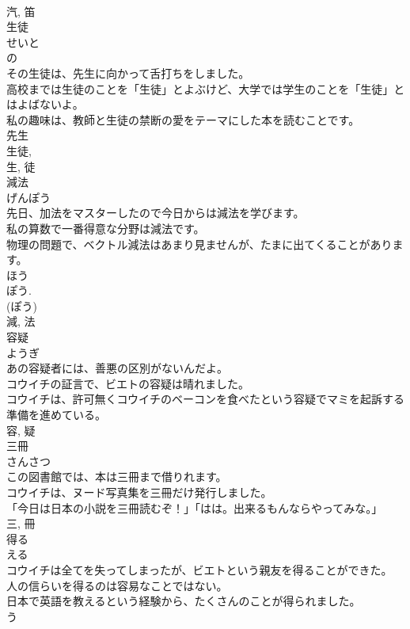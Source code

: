 \documentclass[8pt]{extreport}
\begin{document}
\begin{CJK}{UTF8}{min}
\\	汽, 笛	
\\	生徒	
\\	せいと	
\\	の 
\\	その生徒は、先生に向かって舌打ちをしました。	
\\	高校までは生徒のことを「生徒」とよぶけど、大学では学生のことを「生徒」とはよばないよ。	
\\	私の趣味は、教師と生徒の禁断の愛をテーマにした本を読むことです。	
\\	先生 
\\	生徒, 
\\	生, 徒	
\\	減法	
\\	げんぽう	
\\	先日、加法をマスターしたので今日からは減法を学びます。	
\\	私の算数で一番得意な分野は減法です。	
\\	物理の問題で、ベクトル減法はあまり見ませんが、たまに出てくることがあります。	
\\	ほう 
\\	ぽう. 
\\	(ぽう) 
\\	減, 法	
\\	容疑	
\\	ようぎ	
\\	あの容疑者には、善悪の区別がないんだよ。	
\\	コウイチの証言で、ビエトの容疑は晴れました。	
\\	コウイチは、許可無くコウイチのベーコンを食べたという容疑でマミを起訴する準備を進めている。	
\\	容, 疑	
\\	三冊	
\\	さんさつ	
\\	この図書館では、本は三冊まで借りれます。	
\\	コウイチは、ヌード写真集を三冊だけ発行しました。	
\\	「今日は日本の小説を三冊読むぞ！」「はは。出来るもんならやってみな。」	
\\	三, 冊	
\\	得る	
\\	える	
\\	コウイチは全てを失ってしまったが、ビエトという親友を得ることができた。	
\\	人の信らいを得るのは容易なことではない。	
\\	日本で英語を教えるという経験から、たくさんのことが得られました。	
\\	う 

\end{CJK}
\end{document}
